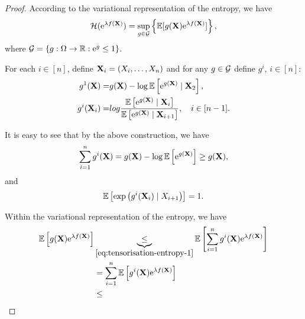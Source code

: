 \begin{proof}
	According to the variational representation of the entropy, we have
	\begin{equation*}
		{\mathcal H}(\mathrm{e}^{\lambda f({\bf X})})=\sup_{g\in{\mathcal G}}\left\{{\mathbb E}[g({\bf X})\mathrm{e}^{\lambda f({\bf X})}]\right\},
	\end{equation*}
	where \({\mathcal G}=\left\{g:\Omega\to{\mathbb R}:\mathrm{e}^{g}\leq 1\right\}\).

	For each $i\in[n]$, define ${\bf X}_{i}=(X_{i},\ldots, X_{n})$ and for any $g\in{\mathcal G}$ define $g^{i}$, $i\in[n]$:
	\begin{equation*}
		\begin{aligned}
			g^{1}({\bf X})=     & g({\bf X})-\log{\mathbb E}\left[\mathrm{e}^{g({\bf X})}\mid {\bf X}_{2}\right],                                                                     \\
			g^{i}({\bf X}_{i})= & log\frac{{\mathbb E}\left[\mathrm{e}^{g({\bf X})}\mid {\bf X}_{i}\right]}{{\mathbb E}\left[\mathrm{e}^{g({\bf X})}\mid {\bf X}_{i+1}\right]},\quad i\in[n-1].
		\end{aligned}
	\end{equation*}

	It is easy to see that by the above construction, we have
	\begin{equation}
		\label{eq:tensorisation-entropy-1}
		\sum_{i=1}^{n}g^{i}({\bf X})=g({\bf X})-\log{\mathbb E}\left[\mathrm{e}^{g({\bf X})}\right]\geq g({\bf X}),
	\end{equation}
	and
	\begin{equation*}
		{\mathbb E}\left[\exp\left(g^{i}({\bf X}_{i})\mid X_{i+1}\right)\right]=1.
	\end{equation*}

	Within the variational representation of the entropy, we have
	\begin{equation*}
		\begin{aligned}
			{\mathbb E}\left[g({\bf X})\mathrm{e}^{\lambda f({\bf X})}\right] & \underbrace{\leq}_{\eqref{eq:tensorisation-entropy-1}}{\mathbb E}\left[\sum_{i=1}^{n}g^{i}({\bf X})\mathrm{e}^{\lambda f({\bf X})}\right] \\
			                                                     & =\sum_{i=1}^{n}{\mathbb E}\left[g^{i}({\bf X})\mathrm{e}^{\lambda f({\bf X})}\right]                                                      \\
			                                                     & \leq
		\end{aligned}
	\end{equation*}
\end{proof}


